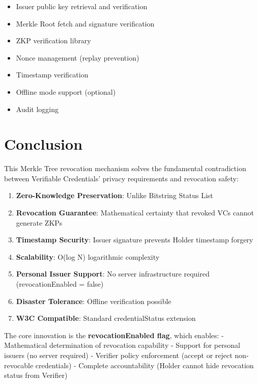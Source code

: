 \begin{itemize}
  \item Issuer public key retrieval and verification
  \item Merkle Root fetch and signature verification
  \item ZKP verification library
  \item Nonce management (replay prevention)
  \item Timestamp verification
  \item Offline mode support (optional)
  \item Audit logging
\end{itemize}

\section{Conclusion}

This Merkle Tree revocation mechanism solves the fundamental contradiction between Verifiable Credentials' privacy requirements and revocation safety:

\begin{enumerate}
  \item \textbf{Zero-Knowledge Preservation}: Unlike Bitstring Status List
  \item \textbf{Revocation Guarantee}: Mathematical certainty that revoked VCs cannot generate ZKPs
  \item \textbf{Timestamp Security}: Issuer signature prevents Holder timestamp forgery
  \item \textbf{Scalability}: O(log N) logarithmic complexity
  \item \textbf{Personal Issuer Support}: No server infrastructure required (revocationEnabled = false)
  \item \textbf{Disaster Tolerance}: Offline verification possible
  \item \textbf{W3C Compatible}: Standard credentialStatus extension
\end{enumerate}

The core innovation is the \textbf{revocationEnabled flag}, which enables:
- Mathematical determination of revocation capability
- Support for personal issuers (no server required)
- Verifier policy enforcement (accept or reject non-revocable credentials)
- Complete accountability (Holder cannot hide revocation status from Verifier)
